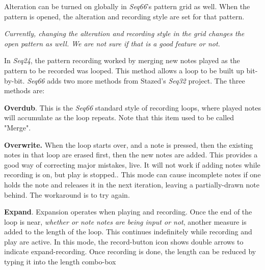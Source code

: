    Alteration can be turned on globally in \textsl{Seq66}'s pattern grid
   as well.
   When the pattern is opened, the alteration and recording style are
   set for that pattern.

   \textsl{Currently, changing the alteration and recording style in the grid
   changes the open pattern as well.  We are not sure if that is a good feature
   or not.}

   In \textsl{Seq24}, the pattern recording worked by merging new notes played
   as the pattern to be recorded was looped.  This method allows a loop to be
   built up bit-by-bit.  \textsl{Seq66} adds two more methods from
   Stazed's \textsl{Seq32} project.  The three methods are:

   \begin{enumber}
      \item \textbf{Overdub}.
         This is the \textsl{Seq66} standard
         style of recording loops, where played notes will
         accumulate as the loop repeats.
         Note that this item used to be called "Merge".
      \item \textbf{Overwrite.}
         When the loop starts over, and a note is pressed,
         then the existing notes in that loop are erased first,
         then the new notes are added.
         This provides a good way of correcting major mistakes, live.
         It will not work if adding notes while recording is on, but
         play is stopped..
         This mode can cause incomplete notes if one
         holds the note and releases it in the next iteration, leaving a
         partially-drawn note behind.  The workaround is to try again.
      \item \textbf{Expand}.
         Expansion operates when playing and recording.
         Once the end of the loop is near, \textsl{whether or note
         notes are being input or not},
         another measure is added to the length of the loop.
         This continues indefinitely while recording and play are active.
         In this mode, the record-button icon shows double arrows to indicate
         expand-recording.
         Once recording is done,
         the length can be reduced by typing it into the length combo-box

\end{enumber}
